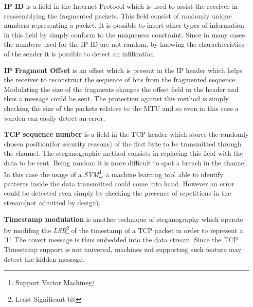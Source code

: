 \documentclass[../../main.tex]{subfiles}
\begin{document}
    \textbf{IP ID} is a field in the Internet Protocol which is used to assist
    the receiver in reassemblying the fragmented packets.
    This field consist of randomly unique numbers representing a packet.
    It is possible to insert other types of information in this field by simply
    conform to the uniqueness constraint.
    Since in many cases the numbers used for the IP ID are not random, by
    knowing the charachteristics of the sender it is possible to detect an
    infiltration.

    \textbf{IP Fragment Offset} is an offset which is present in the IP header
    which helps the receiver to reconstruct the sequence of bits from the
    fragmented sequence.
    Modulating the size of the fragments changes the offset field in the header
    and thus a message could be sent.
    The protection against this method is simply checking the size of the
    packets relative to the MTU and so even in this case a warden can easily
    detect an error.

    \textbf{TCP sequence number} is a field in the TCP header which stores the
    randomly chosen position(for security reasons) of the first byte to be
    transmitted through the channel. The steganographic method consists in
    replacing this field with the data to be sent.
    Being random it is more difficult to spot a breach in the channel.
    In this case the usage of a \emph{SVM}\footnote{Support Vector Machine}, a
    machine learning tool able to identify patterns inside the data transmitted
    could come into hand.
    However an error could be detected even simply by checking the presence of
    repetitions in the stream(not admitted by design). 

    \textbf{Timestamp modulation} is another technique of steganography which
    operate by modifing the \emph{LSB}\footnote{Least Significant bit} of the
    timestamp of a TCP packet in order to represent a '1'.
    The covert message is thus embedded into the data stream.
    Since the TCP Timestamp support is not universal, machines not supporting
    such feature may detect the hidden message.

    \pagebreak
\end{document}
